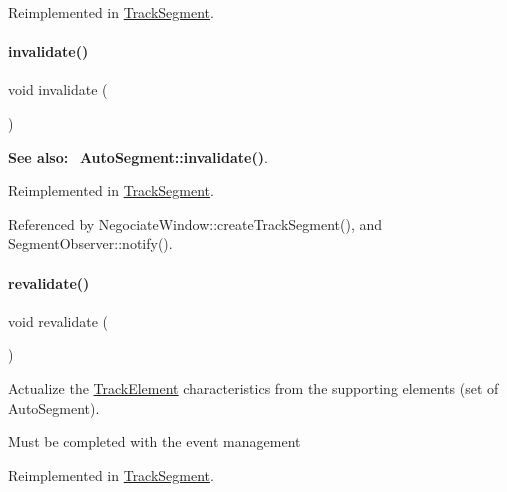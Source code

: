 Reimplemented in \mbox{\hyperlink{classKite_1_1TrackSegment_ac295bade8aee589f6718dfa79edc2a34}{Track\+Segment}}.

\mbox{\label{classKite_1_1TrackElement_a893f1101c650c08c98612515c2b1a89c}} 
\paragraph{\texorpdfstring{invalidate()}{invalidate()}}
{\footnotesize\ttfamily void invalidate (\begin{DoxyParamCaption}{ }\end{DoxyParamCaption})\hspace{0.3cm}{\ttfamily [virtual]}}

{\bfseries See also\+:}~ \textbf{ Auto\+Segment\+::invalidate()}. 

Reimplemented in \mbox{\hyperlink{classKite_1_1TrackSegment_a893f1101c650c08c98612515c2b1a89c}{Track\+Segment}}.



Referenced by Negociate\+Window\+::create\+Track\+Segment(), and Segment\+Observer\+::notify().

\mbox{\label{classKite_1_1TrackElement_a5bd93abe1416952ace15a98dbeeed124}} 
\paragraph{\texorpdfstring{revalidate()}{revalidate()}}
{\footnotesize\ttfamily void revalidate (\begin{DoxyParamCaption}{ }\end{DoxyParamCaption})\hspace{0.3cm}{\ttfamily [virtual]}}

Actualize the \mbox{\hyperlink{classKite_1_1TrackElement}{Track\+Element}} characteristics from the supporting elements (set of Auto\+Segment).

Must be completed with the event management 

Reimplemented in \mbox{\hyperlink{classKite_1_1TrackSegment_a5bd93abe1416952ace15a98dbeeed124}{Track\+Segment}}.

